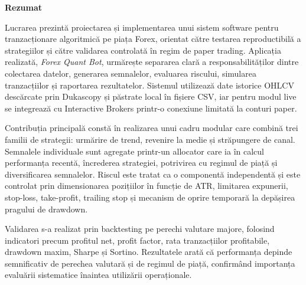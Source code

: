 \newpage
\begin{center}
    \LARGE
    \textbf{\thesistitle}
    
    \vspace{0.5cm}
    
    \authornamefl
    
    \vspace{1cm}
    
    \textbf{Rezumat}
    
    \vspace{1cm}
\end{center}

Lucrarea prezintă proiectarea și implementarea unui sistem software pentru tranzacționare algoritmică pe piața Forex, orientat către testarea reproductibilă a strategiilor și către validarea controlată în regim de paper trading. Aplicația realizată, \textit{Forex Quant Bot}, urmărește separarea clară a responsabilităților dintre colectarea datelor, generarea semnalelor, evaluarea riscului, simularea tranzacțiilor și raportarea rezultatelor. Sistemul utilizează date istorice OHLCV descărcate prin Dukascopy și păstrate local în fișiere CSV, iar pentru modul live se integrează cu Interactive Brokers printr-o conexiune limitată la conturi paper.

Contribuția principală constă în realizarea unui cadru modular care combină trei familii de strategii: urmărire de trend, revenire la medie și străpungere de canal. Semnalele individuale sunt agregate printr-un allocator care ia în calcul performanța recentă, încrederea strategiei, potrivirea cu regimul de piață și diversificarea semnalelor. Riscul este tratat ca o componentă independentă și este controlat prin dimensionarea pozițiilor în funcție de ATR, limitarea expunerii, stop-loss, take-profit, trailing stop și mecanism de oprire temporară la depășirea pragului de drawdown.

Validarea s-a realizat prin backtesting pe perechi valutare majore, folosind indicatori precum profitul net, profit factor, rata tranzacțiilor profitabile, drawdown maxim, Sharpe și Sortino. Rezultatele arată că performanța depinde semnificativ de perechea valutară și de regimul de piață, confirmând importanța evaluării sistematice înaintea utilizării operaționale.
